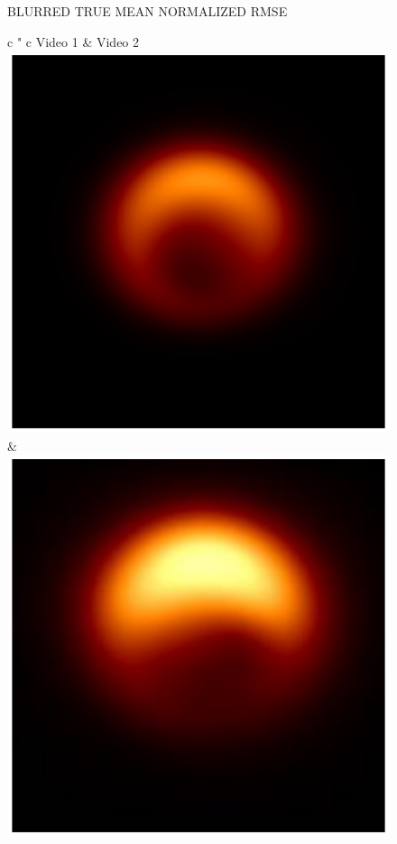 \begin{figure}
	\begin{center}
		\vspace{-0.5in}
		\setlength{\tabcolsep}{3pt}
		
		\hspace{-0.5in}\normalsize{\textsf{BLURRED TRUE MEAN}}  \hspace{5.5cm} \normalsize{\textsf{NORMALIZED RMSE}} 
		\vspace{0.1in}
		
		
						\begin{tabular}{ c " c}
							\hspace{-.06in} \textsf{Video 1} & \hspace{-.06in} \textsf{Video 2} \\
							{{\includegraphics[height=.1\linewidth]{figures/starwarps_results/rotation30/gt/pavgImg_blurredbeam75_noaxis.pdf}} } & {{\includegraphics[height=.1\linewidth]{figures/starwarps_results/hotspot100sR2/gt/pavgImg_blurredbeam75_noaxis.pdf}} } \\ \thickhline

\end{tabular}
\end{center}
\end{figure}
